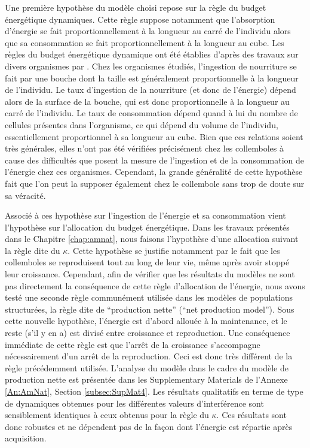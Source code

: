 Une première hypothèse du modèle choisi repose sur la règle du
budget énergétique dynamiques. Cette règle suppose notamment que l'absorption
d'énergie se fait proportionnellement à la longueur au carré de l'individu alors
que sa consommation se fait proportionnellement à la longueur au cube. Les
règles du budget énergétique dynamique ont été établies d'après des travaux sur
divers organismes par \textcites{kooijman2000a}. Chez les organismes étudiés,
l'ingestion de nourriture se fait par une bouche dont la taille est généralement
proportionnelle à la longueur de l'individu. Le taux d'ingestion de la
nourriture (et donc de l'énergie) dépend alors de la surface de la bouche, qui
est donc proportionnelle à la longueur au carré de l'individu. Le taux de
consommation dépend quand à lui du nombre de cellules présentes dans
l'organisme, ce qui dépend du volume de l'individu, essentiellement
proportionnel à sa longueur au cube. Bien que ces relations soient très
générales, elles n'ont pas été vérifiées précisément chez les collemboles à
cause des difficultés que posent la mesure de l'ingestion et de la consommation
de l'énergie chez ces organismes. Cependant, la grande généralité de cette
hypothèse fait que l'on peut la supposer également chez le collembole sans trop
de doute sur sa véracité. 

Associé à ces hypothèse sur l'ingestion de l'énergie et sa consommation vient
l'hypothèse sur l'allocation du budget énergétique. Dans les travaux présentés
dans le Chapitre \ref{chap:amnat}, nous faisons l'hypothèse d'une allocation
suivant la règle dite du $\kappa$. Cette hypothèse se justifie notamment par le
fait que les collemboles se reproduisent tout au long de leur vie, même après
avoir stoppé leur croissance. Cependant, afin de vérifier que les résultats du
modèles ne sont pas directement la conséquence de cette règle d'allocation de
l'énergie, nous avons testé une seconde règle communément utilisée dans les
modèles de populations structurées, la règle dite de ``production nette''
(``net production model''). Sous cette nouvelle hypothèse, l'énergie est d'abord
allouée à la maintenance, et le reste (s'il y en a) est divisé entre croissance
et reproduction. Une conséquence immédiate de cette règle est que l'arrêt de la
croissance s'accompagne nécessairement d'un arrêt de la reproduction. Ceci est
donc très différent de la règle précédemment utilisée. L'analyse du modèle dans
le cadre du modèle de production nette est présentée dans les Supplementary
Materials de l'Annexe \ref{An:AmNat}, Section \ref{subsec:SupMat4}. Les
résultats qualitatifs en terme de type de dynamiques obtenues pour les
différentes valeurs d'interférence sont sensiblement identiques à ceux obtenus
pour la règle du $\kappa$. Ces résultats sont donc robustes et ne dépendent pas
de la façon dont l'énergie est répartie après acquisition. 


